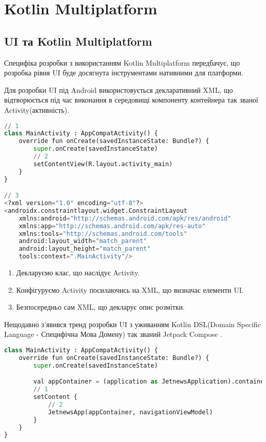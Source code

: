 \chapter{Kotlin Multiplatform}
\label{ch4}


\section{UI та Kotlin Multiplatform}
\label{section.4.1}
Специфіка розробки з використанням Kotlin Multiplatform передбачує, що розробка рівня UI буде досягнута
інструментами нативними для платформи.

Для розробки UI під Android використовується декларативний XML, що відтворюється під час виконання в середовищі компоненту
контейнера так званої Activity(активність).
\begin{lstlisting}[style=light, language=Python,label={lst:android_xml},caption=Android UI with XML]
// 1
class MainActivity : AppCompatActivity() {
    override fun onCreate(savedInstanceState: Bundle?) {
        super.onCreate(savedInstanceState)
        // 2
        setContentView(R.layout.activity_main)
    }
}

// 3
<?xml version="1.0" encoding="utf-8"?>
<androidx.constraintlayout.widget.ConstraintLayout
    xmlns:android="http://schemas.android.com/apk/res/android"
    xmlns:app="http://schemas.android.com/apk/res-auto"
    xmlns:tools="http://schemas.android.com/tools"
    android:layout_width="match_parent"
    android:layout_height="match_parent"
    tools:context=".MainActivity"/>
\end{lstlisting}

\begin{enumerate}
    \item Декларуємо клас, що наслідує Activity.
    \item Конфігуруємо Activity посилаючись на XML, що визначає елементи UI.
    \item Безпосередньо сам XML, що декларує опис розмітки.
\end{enumerate}

Нещодавно з'явився тренд розробки UI з уживанням
Kotlin DSL(Domain Specific Language - Специфічна Мова Домену) так званий Jetpack Compose \cite{jetpack_compose}.

\begin{lstlisting}[style=light, language=Python,label={lst:android_jetpack_compose},caption=Android Jetpack Compose]
class MainActivity : AppCompatActivity() {
    override fun onCreate(savedInstanceState: Bundle?) {
        super.onCreate(savedInstanceState)

        val appContainer = (application as JetnewsApplication).container
        // 1
        setContent {
            // 2
            JetnewsApp(appContainer, navigationViewModel)
        }
    }
}
\end{lstlisting}

